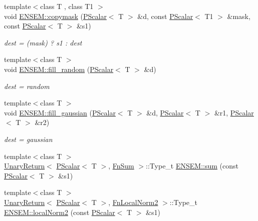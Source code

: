 \begin{DoxyCompactItemize}
{\footnotesize template$<$class T , class T1 $>$ }\\void \mbox{\hyperlink{group__primscalar_gae14d6fea866a875601cb8d100fc8b3c2}{E\+N\+S\+E\+M\+::copymask}} (\mbox{\hyperlink{classENSEM_1_1PScalar}{P\+Scalar}}$<$ T $>$ \&d, const \mbox{\hyperlink{classENSEM_1_1PScalar}{P\+Scalar}}$<$ T1 $>$ \&mask, const \mbox{\hyperlink{classENSEM_1_1PScalar}{P\+Scalar}}$<$ T $>$ \&s1)
\begin{DoxyCompactList}\small\item\em dest = (mask) ? s1 \+: dest \end{DoxyCompactList}\item 
{\footnotesize template$<$class T $>$ }\\void \mbox{\hyperlink{group__primscalar_ga7524cfb0562281bfab7fb3eca1daba0d}{E\+N\+S\+E\+M\+::fill\+\_\+random}} (\mbox{\hyperlink{classENSEM_1_1PScalar}{P\+Scalar}}$<$ T $>$ \&d)
\begin{DoxyCompactList}\small\item\em dest = random \end{DoxyCompactList}\item 
{\footnotesize template$<$class T $>$ }\\void \mbox{\hyperlink{group__primscalar_gaec5e0050ee9c339ede0d4b1a839cea7b}{E\+N\+S\+E\+M\+::fill\+\_\+gaussian}} (\mbox{\hyperlink{classENSEM_1_1PScalar}{P\+Scalar}}$<$ T $>$ \&d, \mbox{\hyperlink{classENSEM_1_1PScalar}{P\+Scalar}}$<$ T $>$ \&r1, \mbox{\hyperlink{classENSEM_1_1PScalar}{P\+Scalar}}$<$ T $>$ \&r2)
\begin{DoxyCompactList}\small\item\em dest = gaussian \end{DoxyCompactList}\item 
{\footnotesize template$<$class T $>$ }\\\mbox{\hyperlink{structENSEM_1_1UnaryReturn}{Unary\+Return}}$<$ \mbox{\hyperlink{classENSEM_1_1PScalar}{P\+Scalar}}$<$ T $>$, \mbox{\hyperlink{structENSEM_1_1FnSum}{Fn\+Sum}} $>$\+::Type\+\_\+t \mbox{\hyperlink{group__primscalar_gaa2733f98f3fc41be9ea11939aa1ee01b}{E\+N\+S\+E\+M\+::sum}} (const \mbox{\hyperlink{classENSEM_1_1PScalar}{P\+Scalar}}$<$ T $>$ \&s1)
\item 
{\footnotesize template$<$class T $>$ }\\\mbox{\hyperlink{structENSEM_1_1UnaryReturn}{Unary\+Return}}$<$ \mbox{\hyperlink{classENSEM_1_1PScalar}{P\+Scalar}}$<$ T $>$, \mbox{\hyperlink{structENSEM_1_1FnLocalNorm2}{Fn\+Local\+Norm2}} $>$\+::Type\+\_\+t \mbox{\hyperlink{group__primscalar_ga21e7b79db399d760e036194c689a5291}{E\+N\+S\+E\+M\+::local\+Norm2}} (const \mbox{\hyperlink{classENSEM_1_1PScalar}{P\+Scalar}}$<$ T $>$ \&s1)

\end{DoxyCompactItemize}
